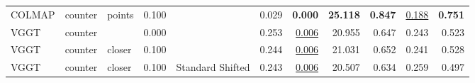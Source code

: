 \begin{table}[H]
\begin{tabular}{lllrlrrrrrr}
COLMAP & counter & points & 0.100 &  & 0.029 & \textbf{0.000} & \textbf{25.118} & \textbf{0.847} & \underline{0.188} & \textbf{0.751} \\
VGGT & counter &  & 0.000 &  & 0.253 & \underline{0.006} & 20.955 & 0.647 & 0.243 & 0.523 \\
VGGT & counter & closer & 0.100 &  & 0.244 & \underline{0.006} & 21.031 & 0.652 & 0.241 & 0.528 \\
VGGT & counter & closer & 0.100 & Standard Shifted & 0.243 & \underline{0.006} & 20.507 & 0.634 & 0.259 & 0.497 \\
\bottomrule
\end{tabular}
\end{table}